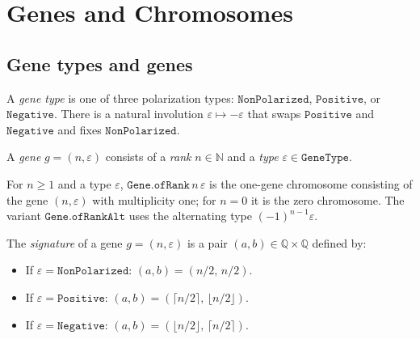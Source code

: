 
\chapter{Genes and Chromosomes}

\section{Gene types and genes}

\begin{definition}
  \label{def:GeneType}
  \leanok
  A \emph{gene type} is one of three polarization types:
  $\mathtt{NonPolarized}$, $\mathtt{Positive}$, or $\mathtt{Negative}$.
  There is a natural involution $\varepsilon \mapsto -\varepsilon$ that swaps
  $\mathtt{Positive}$ and $\mathtt{Negative}$ and fixes $\mathtt{NonPolarized}$.
\end{definition}

\begin{definition}[Gene]
  \label{def:Gene}
  \leanok
  A \emph{gene} $g = (n, \varepsilon)$ consists of a \emph{rank} $n \in \mathbb{N}$
  and a \emph{type} $\varepsilon \in \mathtt{GeneType}$.
\end{definition}

\begin{definition}
  \label{def:Gene.ofRank}
  \leanok
  For $n \ge 1$ and a type $\varepsilon$, $\mathtt{Gene.ofRank}\,n\,\varepsilon$
  is the one-gene chromosome consisting of the gene $(n,\varepsilon)$ with
  multiplicity one; for $n=0$ it is the zero chromosome.  The variant
  $\mathtt{Gene.ofRankAlt}$ uses the alternating type
  $(-1)^{n-1}\varepsilon$.
\end{definition}

\begin{definition}
  \label{def:Gene.signature}
  \leanok
  The \emph{signature} of a gene $g = (n, \varepsilon)$ is a pair
  $(a, b) \in \mathbb{Q} \times \mathbb{Q}$ defined by:
  \begin{itemize}
    \item If $\varepsilon = \mathtt{NonPolarized}$: $(a,b) = (n/2,\, n/2)$.
    \item If $\varepsilon = \mathtt{Positive}$: $(a,b) = (\lceil n/2 \rceil,\, \lfloor n/2 \rfloor)$.
    \item If $\varepsilon = \mathtt{Negative}$: $(a,b) = (\lfloor n/2 \rfloor,\, \lceil n/2 \rceil)$.
  \end{itemize}
\end{definition}

